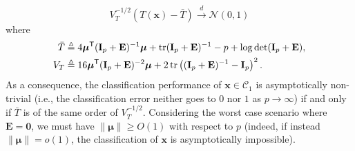 \documentclass[MAL,biber]{nowfnt} %
\newcommand{\T}{{\sf T}}
\DeclareMathOperator{\tr}{tr}
\newcommand{\cd}{{ \xrightarrow{d} }}
\newcommand{\E}{{\mathbf{E}}}
\newcommand{\I}{{\mathbf{I}}}
\newcommand{\x}{{\mathbf{x}}}
\newcommand{\bmu}{{ \boldsymbol{\mu} }}
\newcommand{\zo}{{\mathbf{0}}}
\newcommand{\NN}{{\mathcal{N}}}
\begin{document}
\begin{equation*}
    V_T^{-1/2} ( T(\x) - \bar T ) \cd \NN (0,1)
\end{equation*}
where
\begin{align*}
    \bar T & \triangleq 4\bmu^\T (\I_p + \E)^{-1} \bmu + \tr (\I_p + \E)^{-1} - p + \log \det (\I_p + \E), \\
    V_T & \triangleq 16 \bmu^\T (\I_p + \E)^{-2} \bmu + 2 \tr \left( (\I_p + \E)^{-1} - \I_p \right)^2.
\end{align*}
As a consequence, the classification performance of $\x \in \mathcal{C}_1$ is asymptotically non-trivial (i.e., the classification error neither goes to $0$ nor $1$ as $p \to \infty$) if and only if $\bar T$ is of the same order of $V_T^{-1/2}$. Considering the worst case scenario where $\E = \zo$, we must have $\| \bmu \| \geq O(1)$ with respect to $p$ (indeed, if instead $\| \bmu \|=o(1)$, the classification of $\x$ is asymptotically impossible).
\end{document}
